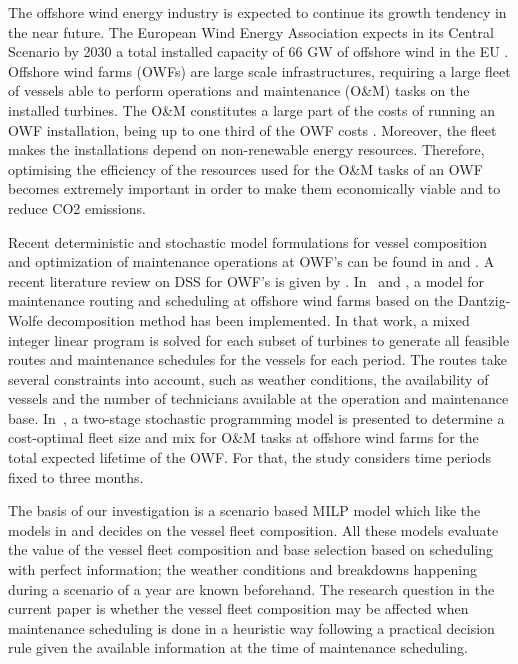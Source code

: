 The offshore wind energy industry is expected to continue its growth tendency in the near future. The European Wind Energy Association expects in its Central Scenario by 2030 a total installed capacity of 66 GW of offshore wind in the EU \cite{WES2030}.
%
Offshore wind farms (OWFs) are large scale infrastructures, requiring a large fleet of vessels able to perform operations and maintenance (O\&M) tasks on the installed turbines. The O\&M constitutes a large part of the costs of running an OWF installation, being up to one third of the OWF costs \cite{Snyder20091567}. Moreover, the fleet makes the installations  depend on non-renewable energy resources. Therefore, optimising the efficiency of the resources used for the O\&M tasks of an OWF becomes extremely important in order to make them economically viable and to reduce CO2 emissions. 

Recent deterministic and stochastic model formulations for vessel composition and  optimization of maintenance operations at OWF's can be found in \cite{Gundegjerde2015} and \cite{HALVORSENWEARE2013}. A recent literature review on DSS for OWF's is given by \cite{hofmannrev}.
%
In~\cite{LijuanDai,EJOR2016} and \cite{STALHANE201592}, a model for maintenance routing and scheduling at offshore wind farms based on the Dantzig-Wolfe decomposition method has been implemented.
In that work, a mixed integer linear program is solved for each subset of turbines to generate all  feasible routes and maintenance schedules for the vessels for each period.
The routes take several constraints into account, such as weather conditions, the availability of vessels and the number of technicians available at the operation and maintenance base.
%
In~\cite{Stalhane2016357}, a two-stage stochastic programming model is presented to determine a cost-optimal fleet size and mix for O\&M tasks at offshore wind farms for the total expected lifetime of the OWF. For that, the study considers time periods fixed to three months.

The basis of our investigation is a scenario based MILP model which like the models in \cite{HALVORSENWEARE2013} and \cite{Stalhane2016357} decides on the vessel fleet composition. All these models evaluate the value of the vessel fleet composition and base selection based on scheduling with perfect information; the weather conditions and breakdowns happening during a scenario of a year are known beforehand. The research question in the current paper is whether the vessel fleet composition may be affected when maintenance scheduling is done in a heuristic way following a practical decision rule given the available information at the time of maintenance scheduling.  


